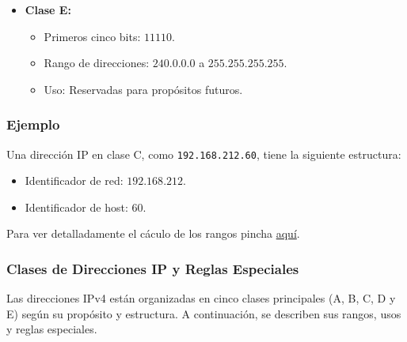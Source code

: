 \documentclass[a4paper,12pt]{article}
\begin{document}
\begin{itemize}
    \item \textbf{Clase E:}
    \begin{itemize}
        \item Primeros cinco bits: \(11110\).
        \item Rango de direcciones: \(240.0.0.0\) a \(255.255.255.255\).
        \item Uso: Reservadas para propósitos futuros.
    \end{itemize}
\end{itemize}

\subsubsection*{Ejemplo}
Una dirección IP en clase C, como \texttt{192.168.212.60}, tiene la siguiente estructura:
\begin{itemize}
    \item Identificador de red: \(192.168.212\).
    \item Identificador de host: \(60\).
\end{itemize}


Para ver detalladamente el cáculo de los rangos pincha \href{https://github.com/ElblogdeIsmael/ElblogdeIsmael.github.io/blob/main/Subjects/Third/FR/Resumenes/ETSIIT/rangosIPcalculo.md}{aquí}.

\subsubsection{Clases de Direcciones IP y Reglas Especiales}

Las direcciones IPv4 están organizadas en cinco clases principales (A, B, C, D y E) según su propósito y estructura. A continuación, se describen sus rangos, usos y reglas especiales.
\end{document}
